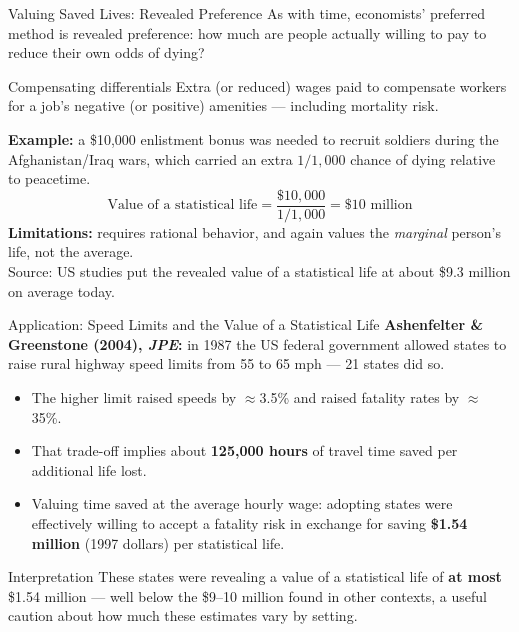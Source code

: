 \documentclass[11pt,aspectratio=169]{beamer}
\newcommand{\srcnote}[1]{{\footnotesize\color{wugray}Source: #1}}
\begin{document}
\begin{frame}{Valuing Saved Lives: Revealed Preference}
  As with time, economists' preferred method is revealed preference: how much are people actually willing to pay to reduce their own odds of dying?
  \begin{block}{Compensating differentials}
    Extra (or reduced) wages paid to compensate workers for a job's negative (or positive) amenities --- including mortality risk.
  \end{block}
  \small \textbf{Example:} a \$10{,}000 enlistment bonus was needed to recruit soldiers during the Afghanistan/Iraq wars, which carried an extra $1/1{,}000$ chance of dying relative to peacetime.
  \[ \text{Value of a statistical life} = \frac{\$10{,}000}{1/1{,}000} = \$10\text{ million} \]
  \normalsize \textbf{Limitations:} requires rational behavior, and again values the \emph{marginal} person's life, not the average.\\
  \srcnote{US studies put the revealed value of a statistical life at about \$9.3 million on average today.}
\end{frame}

\begin{frame}{Application: Speed Limits and the Value of a Statistical Life}
  \textbf{Ashenfelter \& Greenstone (2004), \emph{JPE}:} in 1987 the US federal government allowed states to raise rural highway speed limits from 55 to 65 mph --- 21 states did so.
  \begin{itemize}
    \item The higher limit raised speeds by $\approx$3.5\% and raised fatality rates by $\approx$35\%.
    \item That trade-off implies about \textbf{125{,}000 hours} of travel time saved per additional life lost.
    \item Valuing time saved at the average hourly wage: adopting states were effectively willing to accept a fatality risk in exchange for saving \textbf{\$1.54 million} (1997 dollars) per statistical life.
  \end{itemize}
  \begin{alertblock}{Interpretation}
    These states were revealing a value of a statistical life of \textbf{at most} \$1.54 million --- well below the \$9--10 million found in other contexts, a useful caution about how much these estimates vary by setting.
  \end{alertblock}
\end{frame}

\end{document}
